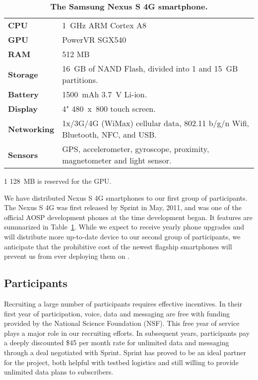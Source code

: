 \begin{table}[t]
\vspace*{0.19in}
\begin{threeparttable}
\begin{tabularx}{\columnwidth}{lX}
\toprule
\textbf{CPU} & 1~GHz ARM Cortex A8 \\
\textbf{GPU} & PowerVR SGX540 \\
\textbf{RAM} & 512 MB\tnote{1} \\
\textbf{Storage} & 16~GB of NAND Flash, divided into 1 and 15~GB partitions.\\
\textbf{Battery} & \num{1500}~mAh 3.7~V Li-ion.\\
\textbf{Display} & 4" 480~x~800 touch screen.\\
\textbf{Networking} & 1x/3G/4G (WiMax) cellular data, 802.11 b/g/n Wifi,
Bluetooth, NFC, and USB.\\
\textbf{Sensors} & GPS, accelerometer, gyroscope, proximity, magnetometer and light sensor.\\
\bottomrule
\end{tabularx}

{\footnotesize
\begin{tablenotes}
\item [1] 128~MB is reserved for the GPU.
\end{tablenotes}}

\caption{\textbf{The Samsung Nexus S 4G smartphone.}}
\label{table-nexuss4g}
\end{threeparttable}
\end{table}

We have distributed Nexus S 4G smartphones to our first group of
participants. The Nexus S 4G was first released by Sprint in May, 2011, and
was one of the official AOSP development phones at the time \PhoneLab{}
development began. It features are summarized in Table~\ref{table-nexuss4g}.
While we expect to receive yearly phone upgrades and will distribute more
up-to-date device to our second group of participants, we anticipate that the
prohibitive cost of the newest flagship smartphones will prevent us from ever
deploying them on \PhoneLab{}.

\subsection{Participants}

Recruiting a large number of \PhoneLab{} participants requires effective
incentives. In their first year of \PhoneLab{} participation, voice, data and
messaging are free with funding provided by the National Science Foundation
(NSF). This free year of service plays a major role in our recruiting
efforts. In subsequent years, participants pay a deeply discounted \$45 per
month rate for unlimited data and messaging through a deal negotiated with
Sprint. Sprint has proved to be an ideal partner for the \PhoneLab{} project,
both helpful with testbed logistics and still willing to provide unlimited
data plans to subscribers.

